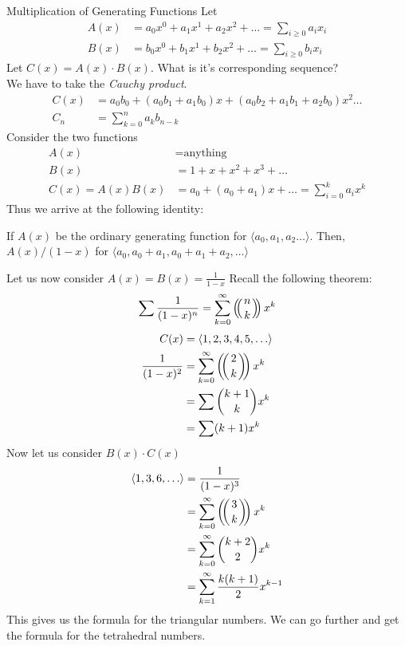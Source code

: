 \begin{subsection}{Multiplication of Generating Functions}
Let
\begin{align*}
    A(x) &= a_0 x^0 + a_1 x^1 + a_2 x^2 + \ldots = \sum_{i\geq 0} a_i x_i \\
    B(x) &= b_0 x^0 + b_1 x^1 + b_2 x^2 + \ldots = \sum_{i\geq 0} b_i x_i
\end{align*}
Let $C(x) = A(x)\cdot B(x)$. What is it's corresponding sequence?\\
We have to take the \emph{Cauchy product}.
\begin{align*}
    C(x) &= a_0b_0 + (a_0 b_1 + a_1 b_0)x + (a_0 b_2 + a_1 b_1 + a_2 b_0)x^2 \ldots \\
    C_n &= \sum_{k=0}^n a_k b_{n-k}
\end{align*}
Consider the two functions
\begin{align*}
    A(x) &= \text{anything} \\
    B(x) &= 1 + x + x^2 + x^3 + \ldots \\
    C(x) = A(x) B(x) &= a_0 + (a_0 + a_1) x + \ldots = \sum_{i=0}^k a_i x^k
\end{align*}
Thus we arrive at the following identity:
\begin{theorem}
If $A(x)$ be the ordinary generating function for $\langle a_0, a_1, a_2 \ldots \rangle$. Then, $A(x)/(1-x)$ for $\langle a_0, a_0+a_1, a_0+a_1+a_2, \ldots \rangle$
\end{theorem}
Let us now consider $A(x) = B(x) = \frac{1}{1-x}$ Recall the following theorem:
$$\sum \frac{1}{(1-x)^n} = \sum_{k=0}^\infty \multiset{n}{k}x^k$$
\begin{align*}
    C(x) &= \langle 1, 2, 3, 4, 5, \ldots \rangle \\
    \frac{1}{(1-x)^2} &= \sum_{k=0}^\infty \multiset{2}{k} x^k \\
    &= \sum \binom{k+1} k x^k \\
    &= \sum (k+1) x^k
\end{align*}
Now let us consider $B(x)\cdot C(x)$
\begin{align*}
    \langle 1, 3, 6, \ldots \rangle &= \frac{1}{(1-x)^3} \\
    &= \sum_{k=0}^\infty \multiset{3}{k}x^k \\
    &= \sum_{k=0}^\infty \binom{k+2}2 x^k \\
    &= \sum_{k=1}^\infty \frac{k(k+1)}{2} x^{k-1}
\end{align*}
This gives us the formula for the triangular numbers. We can go further and get the formula for the tetrahedral numbers.

\end{subsection}
